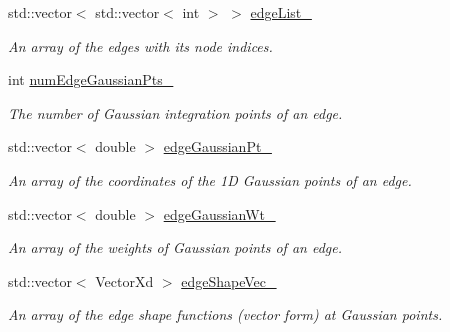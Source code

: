 \begin{DoxyCompactItemize}
std\+::vector$<$ std\+::vector$<$ int $>$ $>$ \mbox{\hyperlink{class_shape_a5834a3c81b025002ff7325c7e030f2cf}{edge\+List\+\_\+}}
\begin{DoxyCompactList}\small\item\em An array of the edges with its node indices. \end{DoxyCompactList}\item 
\mbox{\label{class_shape_a974a69473ea089377e2a45295306142d}} 
int \mbox{\hyperlink{class_shape_a974a69473ea089377e2a45295306142d}{num\+Edge\+Gaussian\+Pts\+\_\+}}
\begin{DoxyCompactList}\small\item\em The number of Gaussian integration points of an edge. \end{DoxyCompactList}\item 
\mbox{\label{class_shape_a607f731349b6bc16fe81a08289c7e452}} 
std\+::vector$<$ double $>$ \mbox{\hyperlink{class_shape_a607f731349b6bc16fe81a08289c7e452}{edge\+Gaussian\+Pt\+\_\+}}
\begin{DoxyCompactList}\small\item\em An array of the coordinates of the 1D Gaussian points of an edge. \end{DoxyCompactList}\item 
\mbox{\label{class_shape_ac44104e1110f94f376419f62c76d4428}} 
std\+::vector$<$ double $>$ \mbox{\hyperlink{class_shape_ac44104e1110f94f376419f62c76d4428}{edge\+Gaussian\+Wt\+\_\+}}
\begin{DoxyCompactList}\small\item\em An array of the weights of Gaussian points of an edge. \end{DoxyCompactList}\item 
\mbox{\label{class_shape_ac668fd1eff17dac98616158e1cab17fa}} 
std\+::vector$<$ Vector\+Xd $>$ \mbox{\hyperlink{class_shape_ac668fd1eff17dac98616158e1cab17fa}{edge\+Shape\+Vec\+\_\+}}
\begin{DoxyCompactList}\small\item\em An array of the edge shape functions (vector form) at Gaussian points. \end{DoxyCompactList}\item 
\mbox{\label{class_shape_af81a39560f87d14ba1a50c9eda7fff12}} 

\end{DoxyCompactItemize}
